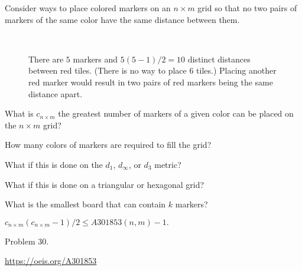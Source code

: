 \documentclass{article}
\begin{document}
Consider ways to place colored markers on an $n \times m$ grid so that no two
pairs of markers of the same color have the same distance between them.

\begin{figure}[!h]
  \centering
  \\
  \caption{
    There are $5$ markers and $5(5-1)/2 = 10$ distinct distances between red
    tiles. (There is no way to place $6$ tiles.)
    Placing another red marker would result in two pairs of red markers being
    the same distance apart.
  }
\end{figure}

\begin{question}
  What is $c_{n \times m}$ the greatest number of markers of a given color can
  be placed on the $n \times m$ grid?
\end{question}
\begin{related}
  \item How many colors of markers are required to fill the grid?
  \item What if this is done on the $d_1$, $d_\infty$, or $d_3$ metric?
  \item What if this is done on a triangular or hexagonal grid?
  \item What is the smallest board that can contain $k$ markers?
\end{related}
\begin{note}
  $c_{n \times m}(c_{n \times m}-1)/2 \leq A301853(n, m) - 1.$
\end{note}
\begin{references}
  \item Problem 30.
  \item \url{https://oeis.org/A301853}
\end{references}
\end{document}
